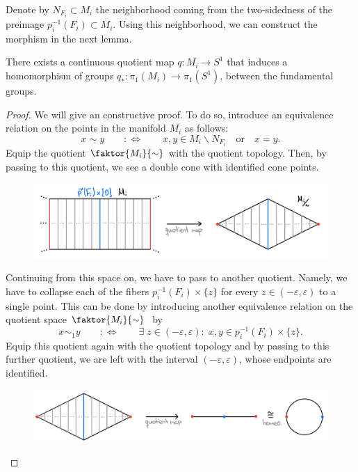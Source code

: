 \noindent
Denote by \(N_{F_i} \subset M_i\) the neighborhood coming from the two-sidedness of the preimage \(p_i^{-1}(F_i) \subset M_i\).
Using this neighborhood, we can construct the morphism in the next lemma.

\begin{lemma}\label{lem:morphism}
    There exists a continuous quotient map \(q : M_i \to S^1\) that induces a homomorphism of groups \(q_* : \pi_1(M_i) \to \pi_1(S^1)\), between the fundamental groups.
\end{lemma}
\begin{proof}
    We will give an constructive proof.
    To do so, introduce an equivalence relation on the points in the manifold \(M_i\) as follows:
    \[x \sim y \qquad :\iff \qquad x,y \in M_i \backslash N_{F_i} \quad\text{or}\quad x = y.\]
    Equip the quotient \(\faktor{M_i}{\sim}\) with the quotient topology.
    Then, by passing to this quotient, we see a double cone with identified cone points.
    \begin{figure}[h!]
        \label{fig:doublecone}
        \centering
        \includegraphics[width=.7\textwidth]{gfx/Quotient 1.png}
    \end{figure}\vspace*{-\parskip}
    
    \noindent
    Continuing from this space on, we have to pass to another quotient.
    Namely, we have to collapse each of the fibers \(p_i^{-1}(F_i) \times \{z\}\) for every \(z \in (-\varepsilon, \varepsilon)\) to a single point.
    This can be done by introducing another equivalence relation on the quotient space \(\faktor{M_i}{\sim}\;\) by 
    \[x \sim_1 y \qquad :\iff \qquad \exists\; z \in (-\varepsilon, \varepsilon): \; x,y \in p_i^{-1}(F_i) \times \{z\}.\]
    Equip this quotient again with the quotient topology and by passing to this further quotient, we are left with the interval \((-\varepsilon, \varepsilon)\), whose endpoints are identified.
    \begin{figure}[ht!]
        \label{fig:circle}
        \centering
        \includegraphics[width=.7\textwidth]{gfx/Quotient 2.png}
    \end{figure}\vspace*{-\parskip}


\end{proof}
